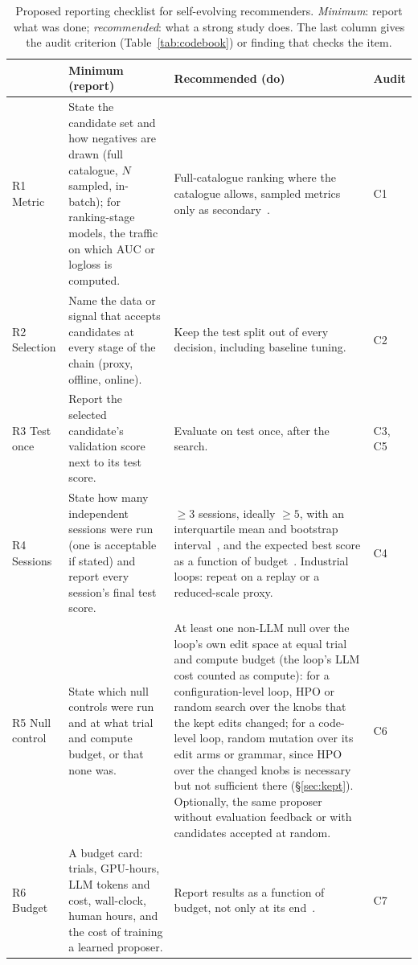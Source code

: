 \documentclass[sigconf,nonacm]{acmart}
\begin{document}
\begin{table}[t]
\caption{Proposed reporting checklist for self-evolving recommenders. \emph{Minimum}: report what was done; \emph{recommended}:
what a strong study does. The last column gives the audit criterion (Table~\ref{tab:codebook}) or finding that checks the item.}\label{tab:checklist}
\small
\begin{tabularx}{\textwidth}{@{}l>{\hsize=0.95\hsize}X>{\hsize=1.05\hsize}Xl@{}}
\toprule
& Minimum (report) & Recommended (do) & Audit \\
\midrule
R1 Metric & State the candidate set and how negatives are drawn (full catalogue, $N$ sampled, in-batch); for
ranking-stage models, the traffic on which AUC or logloss is computed. & Full-catalogue ranking where the catalogue
allows, sampled metrics only as secondary~\cite{krichene2020sampled}. & C1 \\
R2 Selection & Name the data or signal that accepts candidates at every stage of the chain (proxy, offline, online). &
Keep the test split out of every decision, including baseline tuning. & C2 \\
R3 Test once & Report the selected candidate's validation score next to its test score. & Evaluate on test once,
after the search. & C3, C5 \\
R4 Sessions & State how many independent sessions were run (one is acceptable if stated) and report every session's final test score. & $\geq 3$ sessions, ideally $\geq 5$, with
an interquartile mean and bootstrap interval~\cite{agarwal2021precipice}, and the expected best score as a function of
budget~\cite{dodge2019showyourwork}. Industrial loops: repeat on a replay or a reduced-scale proxy. & C4 \\
R5 Null control & State which null controls were run and at what trial and compute budget, or that none was. & At least
one non-LLM null over the loop's own edit space at equal trial and compute budget (the loop's LLM cost counted as compute): for a configuration-level loop, HPO or random search over the knobs that the kept edits changed; for a code-level loop, random mutation over its edit arms or grammar, since HPO over the changed knobs is necessary but not sufficient there (\S\ref{sec:kept}). Optionally, the same proposer without evaluation feedback or with candidates accepted at random. & C6 \\
R6 Budget & A budget card: trials, GPU-hours, LLM tokens and cost, wall-clock, human hours, and the cost of training
a learned proposer. & Report results as a function of budget, not only at its end~\cite{kapoor2025agentsmatter}. & C7 \\

\end{tabularx}
\end{table}
\end{document}
